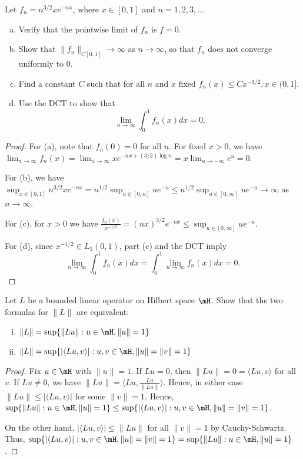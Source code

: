 \documentclass{article}
\begin{document}
 Let $f_n = n^{3/2} x e^{-nx}$, where $x \in [0,1]$ and $n = 1,2,3, \ldots$
\begin{enumerate}[a.]
\item Verify that the pointwise limit of $f_n$ is $f = 0$.
\item Show that $\|f_n\|_{C[0,1]} \to \infty $ as $n \to \infty$, so that $f_n$ does not converge uniformly to $0$.
\item Find a constant $C$ such that for all $n$ and $x$ fixed $f_n(x) \le C x^{-1/2}, x \in (0,1]$.
\item Use the DCT to show that 
$$\lim_{n \to \infty} \int_0^1 f_n(x) dx = 0.$$
\end{enumerate}
\begin{proof}
For (a), note that $f_n(0) = 0$ for all $n$.  For fixed $x > 0$, we have $\lim_{n\to\infty} f_n(x) = \lim_{n\to\infty} x e^{-nx + (3/2) \log n} = x \lim_{u \to -\infty} e^u = 0$.

For (b), we have $\sup_{x \in [0,1]}  n^{3/2} x e^{-nx} = n^{1/2} \sup_{u \in [0,n]}  u e^{-u} \le  n^{1/2} \sup_{u \in [0,\infty]}  u e^{-u} \to \infty$  as $n \to \infty$.

For (c), for $x > 0$ we have $\frac {f_n(x)} {x^{-1/2}} = (nx)^{3/2} e^{-nx} \le \sup_{u \in [0,\infty]}  u e^{-u}$.

For (d), since $x^{-1/2} \in L_1(0,1)$, part (c) and the DCT imply
$$\lim_{n \to \infty} \int_0^1 f_n(x) dx =  \int_0^1 \lim_{n \to \infty} f_n(x) dx =  0.$$
\end{proof}

 Let $L$ be a bounded linear operator on Hilbert space $\mH$. Show that the two formulas for $\|L\|$ are equivalent:
\begin{enumerate}[i.]
\item $\|L\| = \sup\{\|Lu\| : u \in \mH, \|u\| = 1\}$
\item $\|L\| = \sup\{|\langle Lu, v \rangle| : u, v \in \mH, \|u\| = \|v\| = 1 \}$
\end{enumerate}

\begin{proof}
Fix $u \in \mH$ with $\|u\| = 1$.  If $Lu = 0$, then $\|Lu\| = 0 = \langle Lu, v \rangle$ for all $v$. If $Lu \neq 0$, we have $\|Lu\| = \langle Lu, \frac {Lu} {\|Lu\|} \rangle$. Hence, in either case $\|Lu\| \le |\langle Lu, v\rangle |$ for some $\|v\| = 1$.  Hence, $\sup\{\|Lu\| : u \in \mH, \|u\| = 1\} \le \sup\{|\langle Lu, v \rangle| : u, v \in \mH, \|u\| = \|v\| = 1 \}$.

On the other hand, $|\langle Lu, v \rangle| \le \|Lu\|$ for all $\|v\| = 1$ by Cauchy-Schwartz. Thus, $ \sup\{|\langle Lu, v \rangle| : u, v \in \mH, \|u\| = \|v\| = 1 \} = \sup\{\|Lu\| : u \in \mH, \|u\| = 1\}$.
\end{proof}
\end{document}
